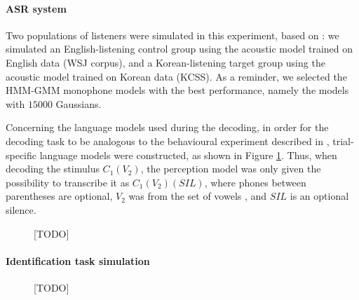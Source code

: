 {\paragraph{ASR system}
Two populations of listeners were simulated in this experiment, based on \cite{durvasula2015}: we simulated an English-listening control group using the acoustic model trained on English data (WSJ corpus), and a Korean-listening target group using the acoustic model trained on Korean data (KCSS). As a reminder, we selected the HMM-GMM monophone models with the best performance, namely the models with $15000$ Gaussians.  

Concerning the language models used during the decoding, in order for the decoding task to be analogous to the behavioural experiment described in \cite{durvasula2015}, trial-specific language models were constructed, as shown in Figure \ref{fig:k-epenth_G}. Thus, when decoding the stimulus $C_{1}(V_{2})$, the perception model was only given the possibility to transcribe it as {\color{red}$C_{1}(V_{2})(SIL)$}, where phones between parentheses are optional, $V_{2}$ was from the set of vowels , and $SIL$ is an optional silence. 

\begin{figure}[htb]
    \centering
    \caption{{\color{red}[TODO]}}%
    \label{fig:k-epenth_G}
  \end{figure}
  
\paragraph{Identification task simulation}
\begin{figure}[htb]
  \centering
  \caption{{\color{red}[TODO]}}%
  \label{fig:k-epenth_align}
\end{figure}

}
